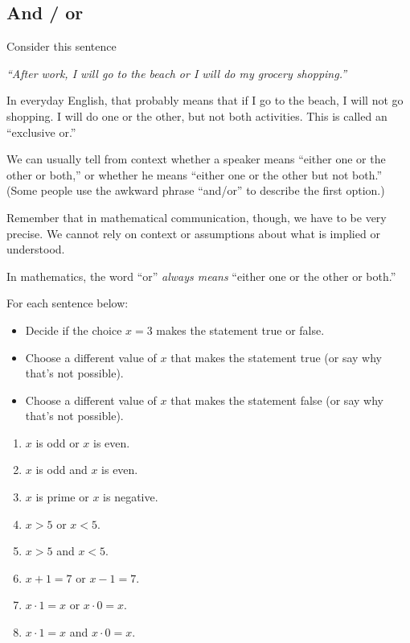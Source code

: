 \subsection{And / or}
Consider this sentence 
\begin{center}
\emph{``After work, I will go to the beach or I will do my grocery shopping.''}
\end{center}
In everyday English, that probably means that if I go to the beach, I will not go shopping.  I will do one or the other, but not both activities.  This is called an ``exclusive or.''

We can usually tell from context whether a speaker means ``either one or the other or both,'' or whether he means ``either one or the other but not both.''  (Some people use the awkward phrase ``and/or'' to describe the first option.)  

Remember that in mathematical communication, though, we have to be very precise.  We cannot rely on context or assumptions about what is implied or understood.
\begin{define}
In mathematics, the word ``or'' \emph{always means} ``either one or the other or both.''
\end{define}

\begin{thinkpair*}
For each sentence below:
\begin{itemize}
\item
Decide if the choice $x = 3$ makes the statement true or false.  
\item
Choose a different value of $x$ that makes the statement true (or say why that's not possible).
\item
Choose a different value of $x$ that makes the statement false (or say why that's not possible).
\end{itemize}

\begin{enumerate}
\item
$x$ is odd or $x$ is even.
\item
$x$ is odd and $x$ is even.
\item
$x$ is prime or $x$ is negative.
\item
$x >5$ or $x < 5$.
\item
$x >5$ and $x < 5$.
\item
$x + 1 = 7$ or $x - 1 = 7$.
\item
$x \cdot 1 = x$ or $x \cdot 0 = x$.
\item
$x \cdot 1 = x$ and $x \cdot 0 = x$.
\end{enumerate}
\end{thinkpair*}



